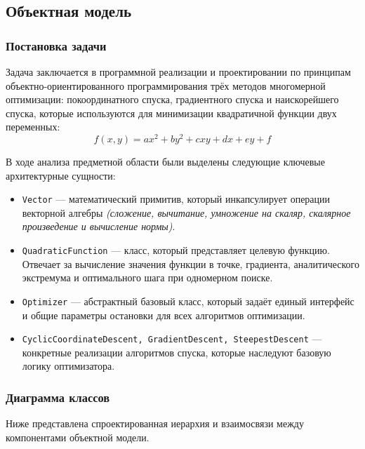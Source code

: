 \subsection{Объектная модель}

\subsubsection{Постановка задачи}

Задача заключается в программной реализации и проектировании по принципам объектно-ориентированного программирования трёх методов многомерной оптимизации: покоординатного спуска, градиентного спуска и наискорейшего спуска, которые используются для минимизации квадратичной функции двух переменных:
\[
  f(x, y) = ax^2 + by^2 + cxy + dx + ey + f
\]

В ходе анализа предметной области были выделены следующие ключевые архитектурные сущности:
\begin{itemize}
    \item \texttt{Vector} --- математический примитив, который инкапсулирует операции векторной алгебры \textit{(сложение, вычитание, умножение на скаляр, скалярное произведение и вычисление нормы)}.
    \item \texttt{QuadraticFunction} --- класс, который представляет целевую функцию. Отвечает за вычисление значения функции в точке, градиента, аналитического экстремума и оптимального шага при одномерном поиске.
    \item \texttt{Optimizer} --- абстрактный базовый класс, который задаёт единый интерфейс и общие параметры остановки для всех алгоритмов оптимизации.
    \item \texttt{CyclicCoordinateDescent, GradientDescent, SteepestDescent} --- конкретные реализации алгоритмов спуска, которые наследуют базовую логику оптимизатора.
\end{itemize}

\subsubsection{Диаграмма классов}
Ниже представлена спроектированная иерархия и взаимосвязи между компонентами объектной модели.

